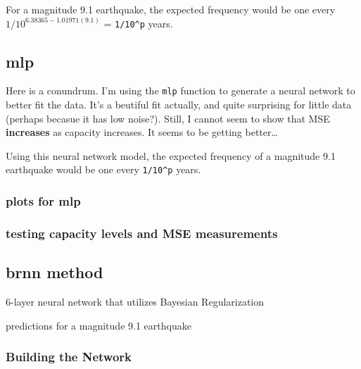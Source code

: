 \documentclass[
]{article}
\newenvironment{Shaded}{\begin{snugshade}}{\end{snugshade}}
\newcommand{\AttributeTok}[1]{\textcolor[rgb]{0.77,0.63,0.00}{#1}}
\newcommand{\CommentTok}[1]{\textcolor[rgb]{0.56,0.35,0.01}{\textit{#1}}}
\newcommand{\DecValTok}[1]{\textcolor[rgb]{0.00,0.00,0.81}{#1}}
\newcommand{\FunctionTok}[1]{\textcolor[rgb]{0.00,0.00,0.00}{#1}}
\newcommand{\NormalTok}[1]{#1}
\newcommand{\OtherTok}[1]{\textcolor[rgb]{0.56,0.35,0.01}{#1}}
\newcommand{\SpecialCharTok}[1]{\textcolor[rgb]{0.00,0.00,0.00}{#1}}
\begin{document}
For a magnitude 9.1 earthquake, the expected frequency would be one
every \(1/10^{6.38365-1.01971(9.1)}\) = \texttt{1/10\^{}p} years.

\hypertarget{mlp}{%
\subsection{mlp}\label{mlp}}

Here is a conundrum. I'm using the \texttt{mlp} function to generate a
neural network to better fit the data. It's a beutiful fit actually, and
quite surprising for little data (perhaps becasue it has low noise?).
Still, I cannot seem to show that MSE \textbf{increases} as capacity
increases. It seems to be getting better\ldots{}

Using this neural network model, the expected frequency of a magnitude
9.1 earthquake would be one every \texttt{1/10\^{}p} years.

\hypertarget{plots-for-mlp}{%
\subsubsection{plots for mlp}\label{plots-for-mlp}}

\hypertarget{testing-capacity-levels-and-mse-measurements}{%
\subsubsection{testing capacity levels and MSE
measurements}\label{testing-capacity-levels-and-mse-measurements}}

\hypertarget{brnn-method}{%
\subsection{brnn method}\label{brnn-method}}

6-layer neural network that utilizes Bayesian Regularization

predictions for a magnitude 9.1 earthquake

\hypertarget{building-the-network}{%
\subsubsection{Building the Network}\label{building-the-network}}

\begin{Shaded}
\end{Shaded}
\end{document}
